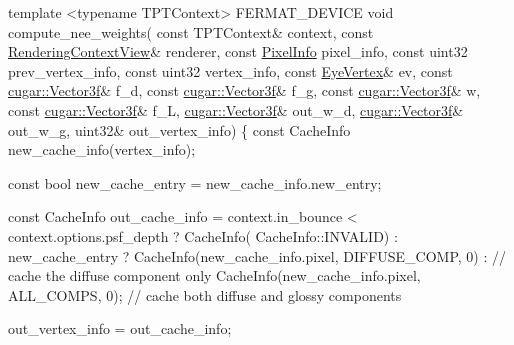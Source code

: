 \begin{DoxyCodeInclude}
    \textcolor{keyword}{template} <\textcolor{keyword}{typename} TPTContext>
    FERMAT\_DEVICE
    \textcolor{keywordtype}{void} compute\_nee\_weights(
        \textcolor{keyword}{const} TPTContext&           context,
        \textcolor{keyword}{const} \hyperlink{struct_rendering_context_view}{RenderingContextView}& renderer,
        \textcolor{keyword}{const} \hyperlink{union_pixel_info}{PixelInfo}                pixel\_info,
        \textcolor{keyword}{const} uint32                prev\_vertex\_info,
        \textcolor{keyword}{const} uint32                vertex\_info,
        \textcolor{keyword}{const} \hyperlink{struct_eye_vertex}{EyeVertex}&           ev,
        \textcolor{keyword}{const} \hyperlink{structcugar_1_1_vector}{cugar::Vector3f}&       f\_d,
        \textcolor{keyword}{const} \hyperlink{structcugar_1_1_vector}{cugar::Vector3f}&       f\_g,
        \textcolor{keyword}{const} \hyperlink{structcugar_1_1_vector}{cugar::Vector3f}&       w,
        \textcolor{keyword}{const} \hyperlink{structcugar_1_1_vector}{cugar::Vector3f}&       f\_L,
              \hyperlink{structcugar_1_1_vector}{cugar::Vector3f}&       out\_w\_d,
              \hyperlink{structcugar_1_1_vector}{cugar::Vector3f}&       out\_w\_g,
              uint32&               out\_vertex\_info)
    \{
        \textcolor{keyword}{const} CacheInfo new\_cache\_info(vertex\_info);

        \textcolor{keyword}{const} \textcolor{keywordtype}{bool} new\_cache\_entry = new\_cache\_info.new\_entry;

        \textcolor{keyword}{const} CacheInfo out\_cache\_info = context.in\_bounce < context.options.psf\_depth ? CacheInfo(
      CacheInfo::INVALID) :
            new\_cache\_entry ?
                CacheInfo(new\_cache\_info.pixel, DIFFUSE\_COMP, 0) :  \textcolor{comment}{// cache the diffuse component only}
                CacheInfo(new\_cache\_info.pixel, ALL\_COMPS, 0);      \textcolor{comment}{// cache both diffuse and glossy
       components}

        out\_vertex\_info = out\_cache\_info;


\end{DoxyCodeInclude}

